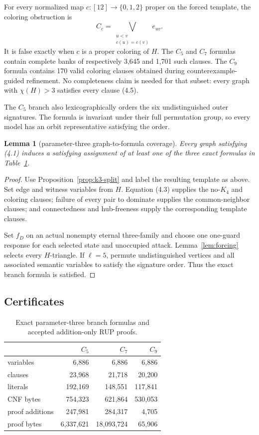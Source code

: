 \documentclass[11pt]{article}
\newtheorem{lemma}[theorem]{Lemma}
\theoremstyle{definition}
\theoremstyle{remark}
\begin{document}
For every normalized map \(c:[12]\to\{0,1,2\}\) proper on the forced
template, the coloring obstruction is
\[
  C_c=\bigvee_{\substack{u<v\\c(u)=c(v)}}e_{uv}.
\tag{4.5}
\]
It is false exactly when \(c\) is a proper coloring of \(H\).
The \(C_5\) and \(C_7\) formulas contain complete banks of respectively
3,645 and 1,701 such clauses.  The \(C_9\) formula contains 170 valid
coloring clauses obtained during counterexample-guided refinement.  No
completeness claim is needed for that subset: every graph with
\(\chi(H)>3\) satisfies every clause (4.5).

The \(C_5\) branch also lexicographically orders the six undistinguished
outer signatures.  The formula is invariant under their full permutation
group, so every model has an orbit representative satisfying the order.

\begin{lemma}[parameter-three graph-to-formula coverage]
\label{lem:k3-coverage}
Every graph satisfying (4.1) induces a satisfying assignment of at least
one of the three exact formulas in Table~\ref{tab:k3}.
\end{lemma}

\begin{proof}
Use Proposition~\ref{prop:k3-split} and label the resulting template as
above.  Set edge and witness variables from \(H\).
Equation (4.3) supplies the no-\(K_4\) and coloring clauses; failure of every
pair to dominate supplies the common-neighbor clauses; and connectedness
and hub-freeness supply the corresponding template clauses.

Set \(f_D\) on an actual nonempty eternal three-family and choose one
one-guard response for each selected state and unoccupied attack.
Lemma~\ref{lem:forcing} selects every \(H\)-triangle.  If \(\ell=5\),
permute undistinguished vertices and all associated semantic variables to
satisfy the signature order.  Thus the exact branch formula is satisfied.
\end{proof}

\subsection{Certificates}

\begin{table}[ht]
\centering
\small
\caption{Exact parameter-three branch formulas and accepted
addition-only RUP proofs.}
\label{tab:k3}
\begin{tabular}{@{}lrrr@{}}
\toprule
 & \(C_5\) & \(C_7\) & \(C_9\)\\
\midrule
variables & 6,886 & 6,886 & 6,886\\
clauses & 23,968 & 21,718 & 20,200\\
literals & 192,169 & 148,551 & 117,841\\
CNF bytes & 754,323 & 621,864 & 530,053\\
proof additions & 247,981 & 284,317 & 4,705\\
proof bytes & 6,337,621 & 18,093,724 & 65,906\\
\bottomrule
\end{tabular}
\end{table}
\end{document}
